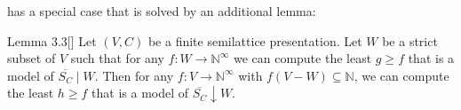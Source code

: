  has a special case that is solved by an additional lemma:

\begin{customlem}{Lemma 3.3}[{\cite[p.~3]{mbezem}}]
\label{lem:3.3}
Let $(V, C)$ be a finite semilattice presentation.
Let $W$ be a strict subset of $V$ such that for any
$f : W \rightarrow \mathbb{N}^{\infty}$ we can
compute the least $g \geq f$ that is a model of $\overline{S_C} \mid W$.
Then for any $f : V \rightarrow \mathbb{N}^{\infty}$ with $f(V - W) \subseteq \mathbb{N}$,
we can compute the least $h \geq f$ that is a model of $\overline{S_C} \downarrow W$.
\end{customlem}
